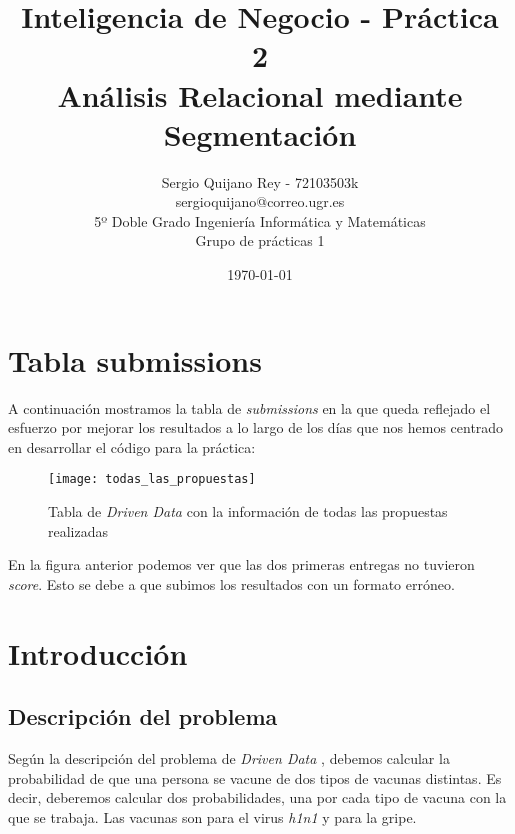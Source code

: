 \documentclass[11pt]{article}
\title{
    {Inteligencia de Negocio - Práctica 2} \\
    {Análisis Relacional mediante Segmentación}
}
\author{
    {Sergio Quijano Rey - 72103503k}\\
    {sergioquijano@correo.ugr.es} \\
    {5º Doble Grado Ingeniería Informática y Matemáticas} \\
    {Grupo de prácticas 1}\\
}
\date{\today}
\begin{document}
\maketitle
\pagebreak

\tableofcontents


\listoffigures

\listoftables

{}

\pagebreak

\section{Tabla submissions}

A continuación mostramos la tabla de \emph{submissions} en la que queda reflejado el esfuerzo por mejorar los resultados a lo largo de los días que nos hemos centrado en desarrollar el código para la práctica:

\begin{figure}[H]
    \centering
    \texttt{[image: todas\_las\_propuestas]}
    \caption{Tabla de \emph{Driven Data} con la información de todas las propuestas realizadas}
\end{figure}

En la figura anterior podemos ver que las dos primeras entregas no tuvieron \emph{score}. Esto se debe a que subimos los resultados con un formato erróneo.

\pagebreak

\section{Introducción}

\subsection{Descripción del problema}

Según la descripción del problema de \emph{Driven Data} \cite{driven_data_problem_description:online}, debemos calcular la probabilidad de que una persona se vacune de dos tipos de vacunas distintas. Es decir, deberemos calcular dos probabilidades, una por cada tipo de vacuna con la que se trabaja. Las vacunas son para el virus \emph{h1n1} y para la gripe.
\end{document}
